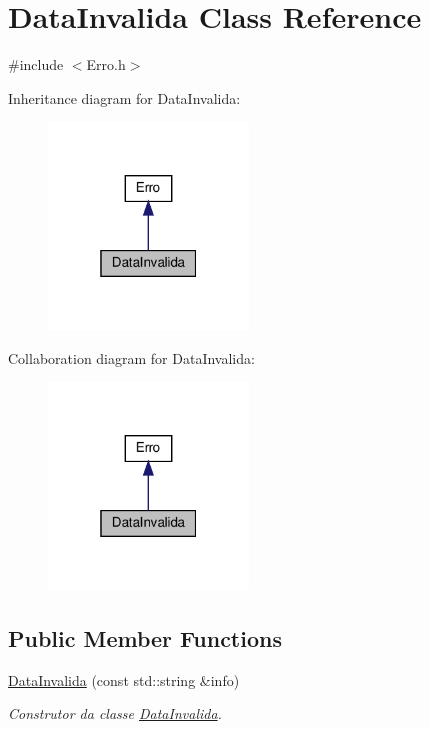 \hypertarget{classDataInvalida}{}\section{Data\+Invalida Class Reference}
\label{classDataInvalida}


{\ttfamily \#include $<$Erro.\+h$>$}



Inheritance diagram for Data\+Invalida\+:
\nopagebreak
\begin{figure}[H]
\begin{center}
\leavevmode
\includegraphics[width=151pt]{classDataInvalida__inherit__graph}
\end{center}
\end{figure}


Collaboration diagram for Data\+Invalida\+:
\nopagebreak
\begin{figure}[H]
\begin{center}
\leavevmode
\includegraphics[width=151pt]{classDataInvalida__coll__graph}
\end{center}
\end{figure}
\subsection*{Public Member Functions}
\begin{DoxyCompactItemize}
\item 
\hyperlink{classDataInvalida_af024b53b8f0ba3c388a6283df30d7123}{Data\+Invalida} (const std\+::string \&info)
\begin{DoxyCompactList}\small\item\em Construtor da classe \hyperlink{classDataInvalida}{Data\+Invalida}. \end{DoxyCompactList}\end{DoxyCompactItemize}



